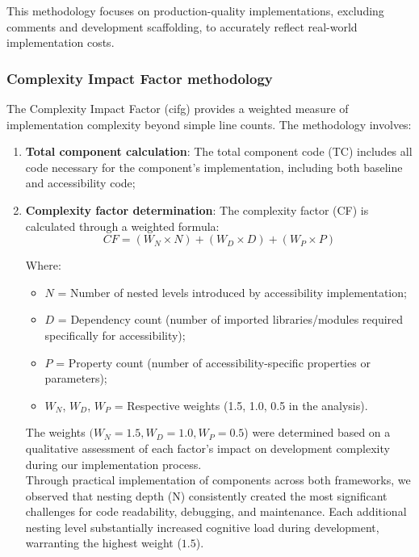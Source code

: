 This methodology focuses on production-quality implementations, excluding comments and development scaffolding, to accurately reflect real-world implementation costs.

\subsubsection{Complexity Impact Factor methodology}
\label{subsubsec:cif-methodology}

The Complexity Impact Factor (\gls{cifg}) provides a weighted measure of implementation complexity beyond simple line counts. The methodology involves:

\begin{enumerate}
    \item \textbf{Total component calculation}: The total component code (TC) includes all code necessary for the component's implementation, including both baseline and accessibility code;
    
    \item \textbf{Complexity factor determination}: The complexity factor (CF) is calculated through a weighted formula:
    \begin{equation}
    CF = (W_N \times N) + (W_D \times D) + (W_P \times P)
    \end{equation}
    
    Where:
    \begin{itemize}
        \item $N$ = Number of nested levels introduced by accessibility implementation;
        \item $D$ = Dependency count (number of imported libraries/modules required specifically for accessibility);
        \item $P$ = Property count (number of accessibility-specific properties or parameters);
        \item $W_N$, $W_D$, $W_P$ = Respective weights (1.5, 1.0, 0.5 in the analysis).
    \end{itemize}

    The weights $(W_N=1.5, W_D=1.0, W_P=0.5$) were determined based on a qualitative assessment of each factor's impact on development complexity during our implementation process. \\

    Through practical implementation of components across both frameworks, we observed that nesting depth (N) consistently created the most significant challenges for code readability, debugging, and maintenance. Each additional nesting level substantially increased cognitive load during development, warranting the highest weight ($1.5$). 


\end{enumerate}

